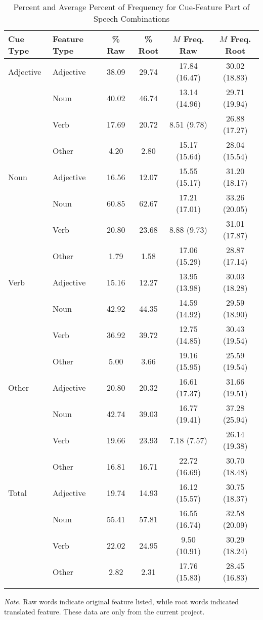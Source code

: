 \documentclass[english,,man]{apa6}
\theoremstyle{definition}
\theoremstyle{definition}
\theoremstyle{definition}
\theoremstyle{remark}
\begin{document}
\begin{table}[tbp]
\begin{center}
\begin{threeparttable}
\caption{\label{tab:percent-table}Percent and Average Percent of Frequency for Cue-Feature Part of Speech Combinations}
\begin{tabular}{llcccc}
\toprule
Cue Type & Feature Type & \% Raw & \% Root & $M$ Freq. Raw & $M$ Freq. Root\\
\midrule
Adjective & Adjective & 38.09 & 29.74 & 17.84 (16.47) & 30.02 (18.83)\\
 & Noun & 40.02 & 46.74 & 13.14 (14.96) & 29.71 (19.94)\\
 & Verb & 17.69 & 20.72 & 8.51 (9.78) & 26.88 (17.27)\\
 & Other & 4.20 & 2.80 & 15.17 (15.64) & 28.04 (15.54)\\
Noun & Adjective & 16.56 & 12.07 & 15.55 (15.17) & 31.20 (18.17)\\
 & Noun & 60.85 & 62.67 & 17.21 (17.01) & 33.26 (20.05)\\
 & Verb & 20.80 & 23.68 & 8.88 (9.73) & 31.01 (17.87)\\
 & Other & 1.79 & 1.58 & 17.06 (15.29) & 28.87 (17.14)\\
Verb & Adjective & 15.16 & 12.27 & 13.95 (13.98) & 30.03 (18.28)\\
 & Noun & 42.92 & 44.35 & 14.59 (14.92) & 29.59 (18.90)\\
 & Verb & 36.92 & 39.72 & 12.75 (14.85) & 30.43 (19.54)\\
 & Other & 5.00 & 3.66 & 19.16 (15.95) & 25.59 (19.54)\\
Other & Adjective & 20.80 & 20.32 & 16.61 (17.37) & 31.66 (19.51)\\
 & Noun & 42.74 & 39.03 & 16.77 (19.41) & 37.28 (25.94)\\
 & Verb & 19.66 & 23.93 & 7.18 (7.57) & 26.14 (19.38)\\
 & Other & 16.81 & 16.71 & 22.72 (16.69) & 30.70 (18.48)\\
Total & Adjective & 19.74 & 14.93 & 16.12 (15.57) & 30.75 (18.37)\\
 & Noun & 55.41 & 57.81 & 16.55 (16.74) & 32.58 (20.09)\\
 & Verb & 22.02 & 24.95 & 9.50 (10.91) & 30.29 (18.24)\\
 & Other & 2.82 & 2.31 & 17.76 (15.83) & 28.45 (16.83)\\
\bottomrule
\addlinespace
\end{tabular}
\begin{tablenotes}[para]
\normalsize{\textit{Note.} Raw words indicate original feature listed, while root words indicated translated feature. These data are only from the current project.}
\end{tablenotes}
\end{threeparttable}
\end{center}
\end{table}
\end{document}
